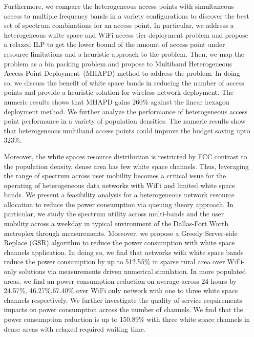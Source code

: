 Furthermore, we compare the heterogeneous access points with simultaneous access to 
multiple frequency bands in a variety configurations to discover the best set of 
spectrum combinations for an access point. In particular, we address a heterogeneous white space and 
WiFi access tier deployment problem and propose a relaxed ILP to get the lower 
bound of the amount of access point under resource limitations and a heuristic 
approach to the problem. Then, we map the problem as a bin packing problem and 
propose to Multiband Heterogeneous Access Point Deployment~(MHAPD) method to address
the problem. In doing so, we discuss the benefit of white space bands 
in reducing the number of access points and provide a heuristic solution for 
wireless network deployment. The numeric results shows that MHAPD gains 260\% 
against the linear hexagon deployment method.  We further analyze the performance 
of heterogeneous access point performance in a variety of population densities. 
The numeric results show that heterogeneous multiband access points could improve the budget 
saving upto 323\%. 

Moreover, the white spaces resource distribution is restricted by FCC contrast to the population density, 
dense area has few white space channels.
Thus, leveraging the range of spectrum across user mobility becomes a critical issue for the operating of 
heterogeneous data networks with WiFi and limited white space bands. 
We present a feasibility analysis for a heterogeneous network resource allocation to reduce 
the power consumption via queuing theory approach.
In particular, we study the spectrum utility across multi-bands and the user mobility across a weekday in 
typical environment of the Dallas-Fort Worth metroplex through measurements. 
Moreover, we propose a Greedy Server-side Replace (GSR) algorithm to reduce the power consumption with 
white space channels application. 
In doing so, we find that networks with white space bands reduce the power consumption by up to 512.55\% in sparse 
rural area over WiFi-only solutions via measurements driven numerical simulation. In more populated areas. we find 
an power consumption reduction on average across 24 hours by 24.57\%, 46.27\%,67.40\% over WiFi only network with 
one to three white space channels respectively.
We further investigate the quality of service requirements impacts on power consumption across the number of channels.
We find that the power consumption reduction is up to 150.89\% with three white space channels in dense areas with 
relaxed required waiting time.

